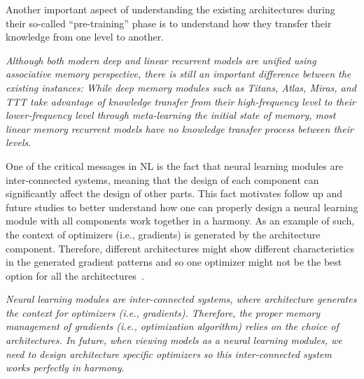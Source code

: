 {Another important aspect of understanding the existing architectures during their so-called ``pre-training'' phase is to understand how they transfer their knowledge from one level to another. 

\begin{myboxismall}
    \textit{Although both modern deep and linear recurrent models are unified using associative memory perspective, there is still an important difference between the existing instances: While deep memory modules such as Titans, Atlas, Miras, and TTT take advantage of knowledge transfer from their high-frequency level to their lower-frequency level through meta-learning the initial state of memory, most linear memory recurrent models have no knowledge transfer process between their levels}.
\end{myboxismall}



One of the critical messages in NL is the fact that neural learning modules are inter-connected systems, meaning that the design of each component can significantly affect the design of other parts. This fact motivates follow up and future studies to better understand how one can properly design a neural learning module with all components work together in a harmony. As an example of such, the context of optimizers (i.e., gradients) is generated by the architecture component. Therefore, different architectures might show different characteristics in the generated gradient patterns and so one optimizer might not be the best option for all the architectures~\citep{zhang2024transformers}. 


\begin{myboxismall}
    \textit{Neural learning modules are inter-connected systems, where architecture generates the context for optimizers (i.e., gradients). Therefore, the proper memory management of gradients (i.e., optimization algorithm) relies on the choice of architectures. In future, when viewing models as a neural learning modules, we need to design architecture specific optimizers so this inter-connected system works perfectly in harmony}.
\end{myboxismall}

}
